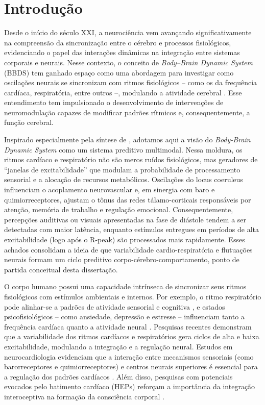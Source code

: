 \chapter{Introdução}
\label{chap:introducao}
Desde o início do século XXI, a neurociência vem avançando significativamente na compreensão da sincronização entre o cérebro e processos fisiológicos, evidenciando o papel das interações dinâmicas na integração entre sistemas corporais e neurais. Nesse contexto, o conceito de \textit{Body--Brain Dynamic System} (BBDS) tem ganhado espaço como uma abordagem para investigar como oscilações neurais se sincronizam com ritmos fisiológicos – como os da frequência cardíaca, respiratória, entre outros –, modulando a atividade cerebral \cite{cohen2017where,criscuolo2022cognition}. Esse entendimento tem impulsionado o desenvolvimento de intervenções de neuromodulação capazes de modificar padrões rítmicos e, consequentemente, a função cerebral.

Inspirado especialmente pela síntese de , adotamos aqui a visão do \textit{Body-Brain Dynamic System} como um sistema preditivo multimodal. Nessa moldura, os ritmos cardíaco e respiratório não são meros ruídos fisiológicos, mas geradores de ``janelas de excitabilidade'' que modulam a probabilidade de processamento sensorial e a alocação de recursos metabólicos.  Oscilações do locus coeruleus influenciam o acoplamento neurovascular e, em sinergia com baro e quimiorreceptores, ajustam o tônus das redes tálamo-corticais responsáveis por atenção, memória de trabalho e regulação emocional. Consequentemente, percepções auditivas ou visuais apresentadas na fase de diástole tendem a ser detectadas com maior latência, enquanto estímulos entregues em períodos de alta excitabilidade (logo após o R-peak) são processados mais rapidamente. Esses achados consolidam a ideia de que variabilidade cardio-respiratória e flutuações neurais formam um ciclo preditivo corpo-cérebro-comportamento, ponto de partida conceitual desta dissertação.

O corpo humano possui uma capacidade intrínseca de sincronizar seus ritmos fisiológicos com estímulos ambientais e internos. Por exemplo, o ritmo respiratório pode alinhar-se a padrões de atividade sensorial e cognitiva \cite{haas1985effects}, e estados psicofisiológicos – como ansiedade, depressão e estresse – influenciam tanto a frequência cardíaca quanto a atividade neural \cite{criscuolo2022cognition}. Pesquisas recentes demonstram que a variabilidade dos ritmos cardíacos e respiratórios gera ciclos de alta e baixa excitabilidade, modulando a integração e a regulação neural. Estudos em neurocardiologia evidenciam que a interação entre mecanismos sensoriais (como barorreceptores e quimiorreceptores) e centros neurais superiores é essencial para a regulação dos padrões cardíacos \cite{marcondes2024linguagem}. Além disso, pesquisas com potenciais evocados pelo batimento cardíaco (HEPs) reforçam a importância da integração interoceptiva na formação da consciência corporal \cite{banelli2020skipping, mackinnon2013utilizing, park2018neural}.

